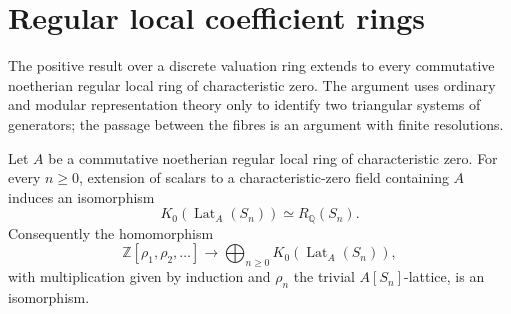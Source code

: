 \section{Regular local coefficient rings}

The positive result over a discrete valuation ring extends to every
commutative noetherian regular local ring of characteristic zero.  The
argument uses ordinary and modular representation theory only to identify
two triangular systems of generators; the passage between the fibres is
an argument with finite resolutions.

\begin{theorem}\label{thm:regular-local}
Let $A$ be a commutative noetherian regular local ring of characteristic
zero.  For every $n\geq 0$, extension of scalars to a characteristic-zero
field containing $A$ induces an isomorphism
\[
 K_0(\operatorname{Lat}_A(S_n))\simeq R_{\mathbb Q}(S_n).
\]
Consequently the homomorphism
\[
 \mathbb Z[\rho_1,\rho_2,\ldots]\longrightarrow
 \bigoplus_{n\geq 0}K_0(\operatorname{Lat}_A(S_n)),
\]
with multiplication given by induction and $\rho_n$ the trivial
$A[S_n]$-lattice, is an isomorphism.
\end{theorem}

